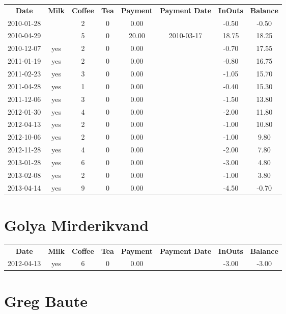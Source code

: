\begin{center}
\begin{tabular}{cccccccc}
\textbf{Date} & \textbf{Milk} & \textbf{Coffee} & \textbf{Tea} & \textbf{Payment} & \textbf{Payment Date} & \textbf{InOuts} & \textbf{Balance} \\
2010-01-28 &  & 2 & 0 &  0.00 &  & -0.50 & -0.50\\ 
2010-04-29 &  & 5 & 0 & 20.00 & 2010-03-17 & 18.75 & 18.25\\ 
2010-12-07 & yes & 2 & 0 &  0.00 &  & -0.70 & 17.55\\ 
2011-01-19 & yes & 2 & 0 &  0.00 &  & -0.80 & 16.75\\ 
2011-02-23 & yes & 3 & 0 &  0.00 &  & -1.05 & 15.70\\ 
2011-04-28 & yes & 1 & 0 &  0.00 &  & -0.40 & 15.30\\ 
2011-12-06 & yes & 3 & 0 &  0.00 &  & -1.50 & 13.80\\ 
2012-01-30 & yes & 4 & 0 &  0.00 &  & -2.00 & 11.80\\ 
2012-04-13 & yes & 2 & 0 &  0.00 &  & -1.00 & 10.80\\ 
2012-10-06 & yes & 2 & 0 &  0.00 &  & -1.00 &  9.80\\ 
2012-11-28 & yes & 4 & 0 &  0.00 &  & -2.00 &  7.80\\ 
2013-01-28 & yes & 6 & 0 &  0.00 &  & -3.00 &  4.80\\ 
2013-02-08 & yes & 2 & 0 &  0.00 &  & -1.00 &  3.80\\ 
2013-04-14 & yes & 9 & 0 &  0.00 &  & -4.50 & -0.70
\end{tabular}
\end{center}

\section{Golya Mirderikvand}

\begin{center}
\begin{tabular}{cccccccc}
\textbf{Date} & \textbf{Milk} & \textbf{Coffee} & \textbf{Tea} & \textbf{Payment} & \textbf{Payment Date} & \textbf{InOuts} & \textbf{Balance} \\
2012-04-13 & yes & 6 & 0 & 0.00 &  & -3.00 & -3.00
\end{tabular}
\end{center}

\section{Greg Baute}

